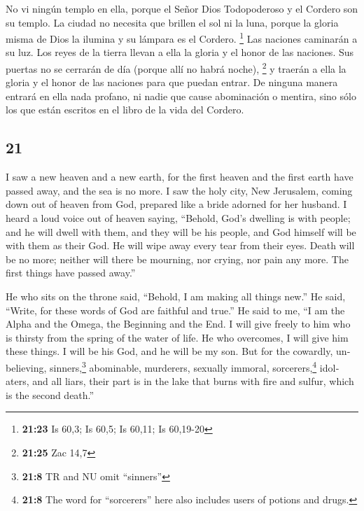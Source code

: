 \begin{paracol}{2}
 No vi ningún templo en ella, porque el Señor Dios
Todopoderoso y el Cordero son su templo.  La ciudad no
necesita que brillen el sol ni la luna, porque la gloria misma de Dios
la ilumina y su lámpara es el Cordero. \footnote{\textbf{21:23} Is 60,3;
  Is 60,5; Is 60,11; Is 60,19-20}  Las naciones caminarán
a su luz. Los reyes de la tierra llevan a ella la gloria y el honor de
las naciones.  Sus puertas no se cerrarán de día (porque
allí no habrá noche), \footnote{\textbf{21:25} Zac 14,7} 
y traerán a ella la gloria y el honor de las naciones para que puedan
entrar.  De ninguna manera entrará en ella nada profano,
ni nadie que cause abominación o mentira, sino sólo los que están
escritos en el libro de la vida del Cordero.

\switchcolumn
\begin{otherlanguage}{english}

\hypertarget{section-41}{%
\section{21}\label{section-41}}

 I saw a new heaven and a new earth, for the first heaven
and the first earth have passed away, and the sea is no more.
 I saw the holy city, New Jerusalem, coming down out of
heaven from God, prepared like a bride adorned for her husband.
 I heard a loud voice out of heaven saying, ``Behold,
God's dwelling is with people; and he will dwell with them, and they
will be his people, and God himself will be with them as their God.
 He will wipe away every tear from their eyes. Death will
be no more; neither will there be mourning, nor crying, nor pain any
more. The first things have passed away.''

 He who sits on the throne said, ``Behold, I am making all
things new.'' He said, ``Write, for these words of God are faithful and
true.''  He said to me, ``I am the Alpha and the Omega,
the Beginning and the End. I will give freely to him who is thirsty from
the spring of the water of life.  He who overcomes, I will
give him these things. I will be his God, and he will be my son.
 But for the cowardly, unbelieving, sinners,\footnote{\textbf{21:8}
  TR and NU omit ``sinners''} abominable, murderers, sexually immoral,
sorcerers,\footnote{\textbf{21:8} The word for ``sorcerers'' here also
  includes users of potions and drugs.} idolaters, and all liars, their
part is in the lake that burns with fire and sulfur, which is the second
death.''


\end{otherlanguage}
\end{paracol}
